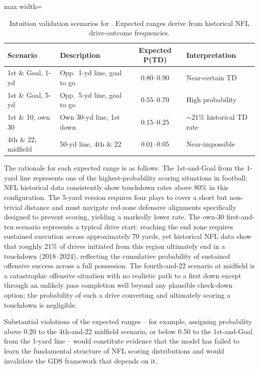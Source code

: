 \begin{table}[htbp]
  \centering
  \caption{Intuition validation scenarios for \xscore{}. Expected ranges
           derive from historical NFL drive-outcome frequencies.}
  \label{tab:intuition}
  \small
  \begin{adjustbox}{max width=\textwidth}
  \begin{tabular}{l l c l}
    \toprule
    \textbf{Scenario} & \textbf{Description} & \textbf{Expected P(TD)}
      & \textbf{Interpretation} \\
    \midrule
    1st \& Goal, 1-yd
      & Opp.\ 1-yd line, goal to go
      & $0.80$--$0.90$
      & Near-certain TD \\[4pt]
    1st \& Goal, 5-yd
      & Opp.\ 5-yd line, goal to go
      & $0.55$--$0.70$
      & High probability \\[4pt]
    1st \& 10, own 30
      & Own 30-yd line, 1st down
      & $0.15$--$0.25$
      & ${\sim}21\%$ historical TD rate \\[4pt]
    4th \& 22, midfield
      & 50-yd line, 4th \& 22
      & $0.01$--$0.05$
      & Near-impossible \\
    \bottomrule
  \end{tabular}
  \end{adjustbox}
\end{table}

The rationale for each expected range is as follows. The 1st-and-Goal from
the 1-yard line represents one of the highest-probability scoring situations
in football; NFL historical data consistently show touchdown rates above 80\%
in this configuration. The 5-yard version requires four plays to cover a short
but non-trivial distance and must navigate red-zone defensive alignments
specifically designed to prevent scoring, yielding a markedly lower rate.
The own-30 first-and-ten scenario represents a typical drive start: reaching
the end zone requires sustained execution across approximately 70 yards, yet
historical NFL data show that roughly 21\% of drives initiated from this
region ultimately end in a touchdown (2018--2024), reflecting the cumulative
probability of sustained offensive success across a full possession.
The fourth-and-22 scenario at midfield is a catastrophic offensive situation
with no realistic path to a first down except through an unlikely pass
completion well beyond any plausible check-down option; the probability of
such a drive converting and ultimately scoring a touchdown is negligible.

Substantial violations of the expected ranges -- for example, assigning
probability above 0.20 to the 4th-and-22 midfield scenario, or below 0.50
to the 1st-and-Goal from the 1-yard line -- would constitute evidence that
the model has failed to learn the fundamental structure of NFL scoring
distributions and would invalidate the GDS framework that depends on it.

